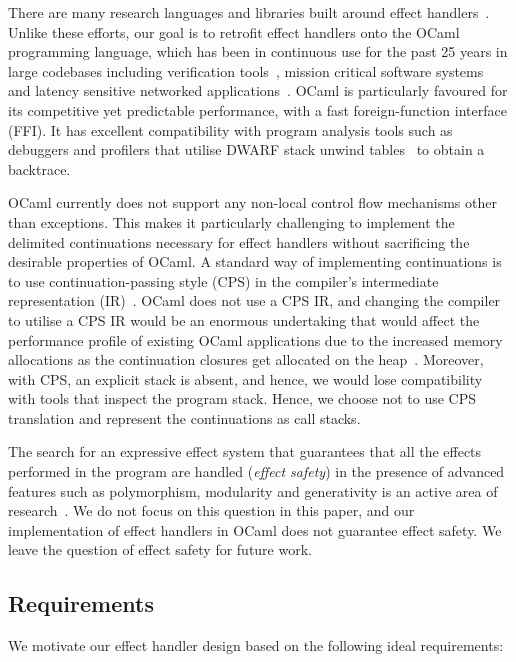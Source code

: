 \documentclass[sigplan,screen]{acmart}
\begin{document}
There are many research languages and libraries built around effect
handlers~\cite{Leijen14,Hillerstrom20,Pyro,Frank,Eff}. Unlike these efforts,
our goal is to retrofit effect handlers onto the OCaml programming language,
which has been in continuous use for the past 25 years in large codebases
including verification tools~\cite{everest,Coq}, mission critical software
systems~\cite{astree} and latency sensitive networked
applications~\cite{Madhavapeddy13}. OCaml is particularly favoured for its
competitive yet predictable performance, with a fast foreign-function interface
(FFI). It has excellent compatibility with program analysis tools such as
debuggers and profilers that utilise DWARF stack unwind tables~\cite{DWARF} to
obtain a backtrace.

OCaml currently does not support any non-local control flow mechanisms other
than exceptions. This makes it particularly challenging to implement the
delimited continuations necessary for effect handlers without sacrificing the
desirable properties of OCaml. A standard way of implementing continuations is
to use continuation-passing style (CPS) in the compiler's intermediate
representation (IR)~\cite{Leijen14}. OCaml does not use a CPS IR, and changing
the compiler to utilise a CPS IR would be an enormous undertaking that would
affect the performance profile of existing OCaml applications due to the
increased memory allocations as the continuation closures get allocated on the
heap~\cite{Farvardin20}. Moreover, with CPS, an explicit stack is absent, and
hence, we would lose compatibility with tools that inspect the program stack.
Hence, we choose not to use CPS translation and represent the continuations as
call stacks.

The search for an expressive effect system that guarantees that all the effects
performed in the program are handled (\emph{effect safety}) in the presence of
advanced features such as polymorphism, modularity and generativity is an
active area of research~\cite{Leijen14, Biernacki19, Biernacki20,
Hillerstrom20}. We do not focus on this question in this paper, and our
implementation of effect handlers in OCaml does not guarantee effect safety. We
leave the question of effect safety for future work.

\subsection{Requirements}
\label{sec:req}

We motivate our effect handler design based on the following ideal
requirements:
\end{document}
